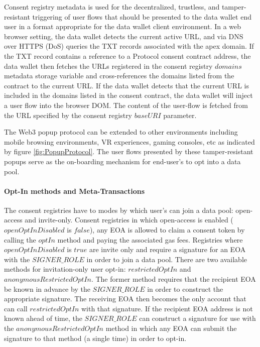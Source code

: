 Consent registry metadata is used for the decentralized, trustless, and tamper-resistant triggering of user flows that should be presented to the data wallet 
end user in a format appropriate for the data wallet client environment. In a web browser setting, the data wallet detects the current active URL, and via DNS 
over HTTPS (DoS) queries the TXT records associated with the apex domain. If the TXT record contains a reference to a Protocol consent 
contract address, the data wallet then fetches the URLs registered in the consent registry $domains$ metadata storage variable and cross-references the domains 
listed from the contract to the current URL. If the data wallet detects that the current URL is included in the domains listed in the 
consent contract, the data wallet will inject a user flow into the browser DOM. The content of the user-flow is fetched from the URL specified by the consent 
registry $baseURI$ parameter. 

The Web3 popup protocol can be extended to other environments including mobile browsing environments, VR experiences, gaming consoles, etc as indicated by 
figure \ref{fig:PopupProtocol}. The user flows presented by these tamper-resistant popups serve as the on-boarding mechanism for end-user's to opt into a data pool.

\paragraph{Opt-In methods and Meta-Transactions}

The consent registries have to modes by which user's can join a data pool: open-access and invite-only. Consent registries in which open-access is 
enabled ($openOptInDisabled$ is $false$), any EOA is allowed to claim a consent token by calling the $optIn$ method and paying the associated gas
fees. Registries where $openOptInDisabled$ is $true$ are invite only and require a signature for an EOA with the $SIGNER\_ROLE$ in order to join 
a data pool. There are two available methods for invitation-only user opt-in: $restrictedOptIn$ and $anonymousRestrictedOptIn$. The former method
requires that the recipient EOA be known in advance by the $SIGNER\_ROLE$ in order to construct the appropriate signature. The receiving EOA then 
becomes the only account that can call $restrictedOptIn$ with that signature. If the recipient EOA address is not known ahead of time, the $SIGNER\_ROLE$
can construct a signature for use with the $anonymousRestrictedOptIn$ method in which any EOA can submit the signature to that method (a single time) 
in order to opt-in. 

